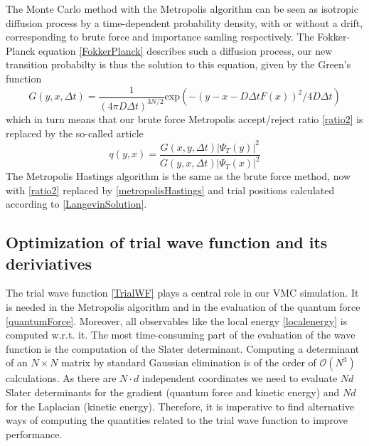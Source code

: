 \documentclass[english, a4paper]{article}
\begin{document}
\noindent The Monte Carlo method with the Metropolis algorithm can be seen as isotropic diffusion process 
by a time-dependent 
probability density, with or without a drift, corresponding to brute force and importance samling respectively.
The Fokker-Planck equation \eqref{FokkerPlanck} describes such a diffusion process, our
new transition probabilty is thus the solution to this equation, given by the Green's function
\begin{equation}
 G(y, x, \Delta t) = \frac{1}{(4\pi D \Delta t)^{3N/2}}
 \textrm{exp}(-(y - x - D\Delta t F(x))^2 / 4D\Delta t)
\end{equation}
which in turn means that our brute force Metropolis accept/reject ratio \eqref{ratio2} is replaced by
the so-called  article
\begin{equation}
 q(y, x) = \frac{G(x, y, \Delta t)|\Psi_T(y)|^2}{G(y, x, \Delta t)|\Psi_T(x)|^2}
 \label{metropolisHastings}
\end{equation}
The Metropolis Hastings algorithm is the same as the brute force method, now with \eqref{ratio2} replaced by 
\eqref{metropolisHastings} and trial positions
calculated according to \eqref{LangevinSolution}.

\subsection{Optimization of trial wave function and its deriviatives}

The trial wave function \eqref{TrialWF} plays a central role in our VMC simulation.
It is needed in the Metropolis algorithm and in the evaluation of the quantum force \eqref{quantumForce}.
Moreover, all observables like the local energy \eqref{localenergy} is computed w.r.t. it. 
The most time-consuming part of the evaluation of the wave function is the computation of the Slater determinant. 
Computing a determinant of an $ N \times N$ matrix by standard Gaussian elimination is of the order of
$\mathcal{O}(N^3)$ calculations. As there are $N \cdot d$ independent coordinates we need to 
evaluate $Nd$ Slater determinants for the gradient (quantum force and kinetic energy) and $Nd$ for 
the Laplacian (kinetic energy). Therefore, it is imperative to find alternative ways of computing
the quantities related to the trial wave function to improve performance. \\
\end{document}
